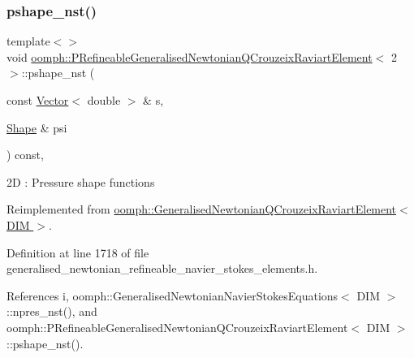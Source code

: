 \subsubsection{\texorpdfstring{pshape\+\_\+nst()}{pshape\_nst()}\hspace{0.1cm}{\footnotesize\ttfamily [3/6]}}
{\footnotesize\ttfamily template$<$$>$ \\
void \hyperlink{classoomph_1_1PRefineableGeneralisedNewtonianQCrouzeixRaviartElement}{oomph\+::\+P\+Refineable\+Generalised\+Newtonian\+Q\+Crouzeix\+Raviart\+Element}$<$ 2 $>$\+::pshape\+\_\+nst (\begin{DoxyParamCaption}\item[{const \hyperlink{classoomph_1_1Vector}{Vector}$<$ double $>$ \&}]{s,  }\item[{\hyperlink{classoomph_1_1Shape}{Shape} \&}]{psi }\end{DoxyParamCaption}) const\hspace{0.3cm}{\ttfamily [inline]}, {\ttfamily [virtual]}}

2D \+: Pressure shape functions 

Reimplemented from \hyperlink{classoomph_1_1GeneralisedNewtonianQCrouzeixRaviartElement_ac67f51cf0d592e011ea165f62ff8976e}{oomph\+::\+Generalised\+Newtonian\+Q\+Crouzeix\+Raviart\+Element$<$ D\+I\+M $>$}.



Definition at line 1718 of file generalised\+\_\+newtonian\+\_\+refineable\+\_\+navier\+\_\+stokes\+\_\+elements.\+h.



References i, oomph\+::\+Generalised\+Newtonian\+Navier\+Stokes\+Equations$<$ D\+I\+M $>$\+::npres\+\_\+nst(), and oomph\+::\+P\+Refineable\+Generalised\+Newtonian\+Q\+Crouzeix\+Raviart\+Element$<$ D\+I\+M $>$\+::pshape\+\_\+nst().

\mbox{\label{classoomph_1_1PRefineableGeneralisedNewtonianQCrouzeixRaviartElement_a7d05683bf0896faeb1331a84b0add869}} 
